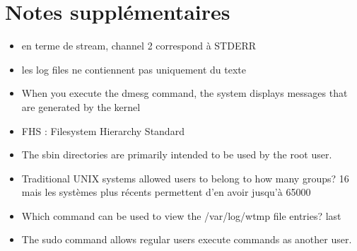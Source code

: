 \documentclass{article}
\begin{document}
\section{Notes supplémentaires}
\begin{itemize}
	\item en terme de stream, channel 2 correspond à STDERR
    \item les log files ne contiennent pas uniquement du texte
    \item When you execute the dmesg command, the system displays messages that are generated by the kernel
    \item FHS : Filesystem Hierarchy Standard
    \item The sbin directories are primarily intended to be used by the root user.
    \item Traditional UNIX systems allowed users to belong to how many groups? 16 mais les systèmes plus récents permettent d'en avoir jusqu'à 65000
    \item Which command can be used to view the /var/log/wtmp file entries? last
    \item The sudo command allows regular users execute commands as another user.

\end{itemize}
\end{document}
